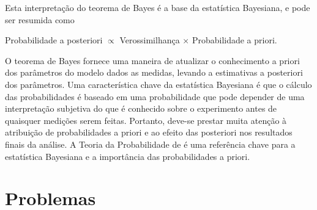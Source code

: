 Esta interpretação do teorema de Bayes é a base da estatística Bayesiana, e pode ser resumida como
\begin{center}
Probabilidade a posteriori $\propto$ Verossimilhança $\times$ Probabilidade a priori.
\end{center}

O teorema de Bayes fornece uma maneira de atualizar o conhecimento a priori dos parâmetros do modelo dados as medidas, levando a estimativas a posteriori dos parâmetros. Uma característica chave da estatística Bayesiana é que o cálculo das probabilidades é baseado em uma probabilidade que pode depender de uma interpretação subjetiva do que é conhecido sobre o experimento antes de quaisquer medições serem feitas. Portanto, deve-se prestar muita atenção à atribuição de probabilidades a priori e ao efeito das posteriori nos resultados finais da análise. A Teoria da Probabilidade de \citet{jeffreys1998theory} é uma referência chave para a estatística Bayesiana e a importância das probabilidades a priori.

\section{Problemas}


